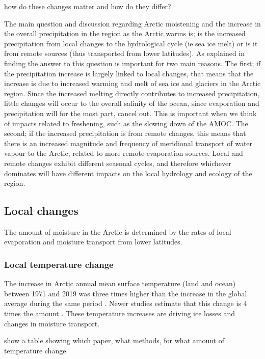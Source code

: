 \documentclass[12pt, oneside]{article}
\begin{document}
{\color{blue}how do these changes matter and how do they differ?}

The main question and discussion regarding Arctic moistening and the increase in the overall precipitation in the region as the Arctic warms is; is the increased precipitation from local changes to the hydrological cycle (ie sea ice melt) or is it from remote sources (thus transported from lower latitudes). As explained in \cite{bintanja2014future} finding the answer to this question is important for two main reasons. The first; if the precipitation increase is largely linked to local changes, that means that the increase is due to increased warming and melt of sea ice and glaciers in the Arctic region. Since the increased melting directly contributes to increased precipitation, little changes will occur to the overall salinity of the ocean, since evaporation and precipitation will for the most part, cancel out. This is important when we think of impacts related to freshening, such as the slowing down of the AMOC. The second; if the increased precipitation is from remote changes, this means that there is an increased magnitude and frequency of meridional transport of water vapour to the Arctic, related to more remote evaporation sources. Local and remote changes exhibit different seasonal cycles, and therefore whichever dominates will have different impacts on the local hydrology and ecology of the region.


\subsection{Local changes}\label{local}
The amount of moisture in the Arctic is determined by the rates of local evaporation and moisture transport from lower latitudes.

\subsubsection{Local temperature change}\label{local_temp}
The increase in Arctic annual mean surface temperature (land and ocean) between 1971 and 2019 was three times higher than the increase in the global average during the same period \cite{AMAP}. Newer studies estimate that this change is 4 times the amount \cite{rantanen2022arctic}. These temperature increases are driving ice losses and changes in moisture transport.


show a table showing which paper, what methods, for what amount of temperature change
\end{document}
